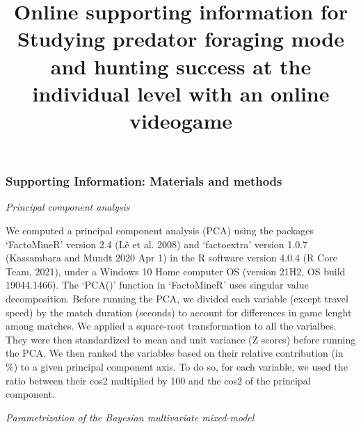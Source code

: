 \documentclass[
  11pt,
]{article}
\title{Online supporting information for\\
Studying predator foraging mode and hunting success at the individual
level with an online videogame}
\author{}
\date{\vspace{-2.5em}}
\begin{document}
\maketitle

\newpage

\hypertarget{supporting-information-materials-and-methods}{%
\subsubsection*{Supporting Information: Materials and
methods}\label{supporting-information-materials-and-methods}}

\begin{center}
\emph{Principal component analysis}
\end{center}

We computed a principal component analysis (PCA) using the packages
`FactoMineR' version 2.4 (Lê et al. 2008) and `factoextra' version 1.0.7
(Kassambara and Mundt 2020 Apr 1) in the R software version 4.0.4 (R
Core Team, 2021), under a Windows 10 Home computer OS (version 21H2, OS
build 19044.1466). The `PCA()' function in `FactoMineR' uses singular
value decomposition. Before running the PCA, we divided each variable
(except travel speed) by the match duration (seconds) to account for
differences in game lenght among matches. We applied a square-root
transformation to all the varialbes. They were then standardized to mean
and unit variance (Z scores) before running the PCA. We then ranked the
variables based on their relative contribution (in \%) to a given
principal component axis. To do so, for each variable, we used the ratio
between their cos2 multiplied by 100 and the cos2 of the principal
component.

\begin{center}
\emph{Parametrization of the Bayesian multivariate mixed-model}
\end{center}
\end{document}
